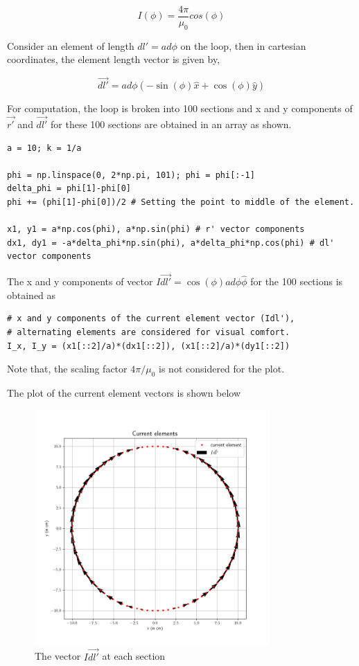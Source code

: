 \documentclass[12pt, a4paper]{article}
\begin{document}
\begin{equation*}
I(\phi) = \frac{4\pi}{\mu_0}cos(\phi)
\end{equation*}

Consider an element of length $dl' = ad\phi$ on the loop, then in cartesian coordinates, the element length vector is given by,

\begin{equation*}
\vec{dl'} = a d\phi (-\sin(\phi) \hat{x} + \cos(\phi) \hat{y})
\end{equation*} 

For computation, the loop is broken into 100 sections and x and y components of $\vec{r'}$ and $\vec{dl'}$ for these 100 sections are obtained in an array as shown.

\begin{lstlisting}
a = 10; k = 1/a

phi = np.linspace(0, 2*np.pi, 101); phi = phi[:-1]
delta_phi = phi[1]-phi[0]
phi += (phi[1]-phi[0])/2 # Setting the point to middle of the element.

x1, y1 = a*np.cos(phi), a*np.sin(phi) # r' vector components
dx1, dy1 = -a*delta_phi*np.sin(phi), a*delta_phi*np.cos(phi) # dl' vector components
\end{lstlisting}

The x and y components of vector $I \vec{dl'} = \cos(\phi)a d\phi \hat{\phi}$ for the 100 sections is obtained as

\begin{lstlisting}
# x and y components of the current element vector (Idl'), 
# alternating elements are considered for visual comfort.
I_x, I_y = (x1[::2]/a)*(dx1[::2]), (x1[::2]/a)*(dy1[::2])
\end{lstlisting}

Note that, the scaling factor $4\pi/ \mu_0$ is not considered for the plot.

The plot of the current element vectors is shown below

\begin{figure}[H]
\centering
\includegraphics[width=0.8\textwidth]{current.png}
\caption{The vector $I\vec{dl'}$ at each section}
\end{figure}
\end{document}
